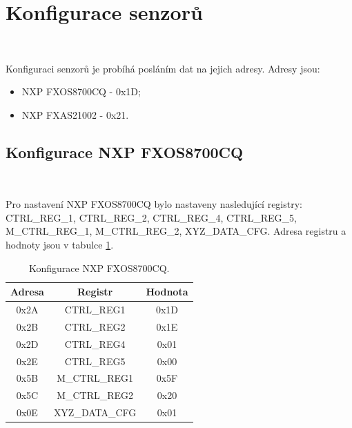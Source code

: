 \section{Konfigurace senzorů}\

Konfiguraci senzorů je probíhá posláním dat na jejich adresy. Adresy
jsou:
\begin{itemize}
    \item NXP FXOS8700CQ - 0x1D;
    \item NXP FXAS21002 - 0x21.
\end{itemize}

\subsection{Konfigurace NXP FXOS8700CQ}\

Pro nastavení NXP FXOS8700CQ bylo nastaveny nasledující registry: CTRL\_REG\_1,
CTRL\_REG\_2, CTRL\_REG\_4, CTRL\_REG\_5, M\_CTRL\_REG\_1, M\_CTRL\_REG\_2,
XYZ\_DATA\_CFG. Adresa registru a hodnoty jsou v tabulce \ref{tab:FXOS8700CQ}.

\begin{table}[!h]
    \centering
	\begin{tabular}{ccc}
        \hline
        \textbf{Adresa} & \textbf{Registr} & \textbf{Hodnota} \\
        \hline
        0x2A            & CTRL\_REG1       & 0x1D             \\
        0x2B            & CTRL\_REG2       & 0x1E             \\
        0x2D            & CTRL\_REG4       & 0x01             \\
        0x2E            & CTRL\_REG5       & 0x00             \\
        0x5B            & M\_CTRL\_REG1    & 0x5F             \\
        0x5C            & M\_CTRL\_REG2    & 0x20             \\
        0x0E            & XYZ\_DATA\_CFG   & 0x01             \\
        \hline
    \end{tabular}
    \caption{Konfigurace NXP FXOS8700CQ\cite{FXOS8700CQ}.}
    \label{tab:FXOS8700CQ}
\end{table}

